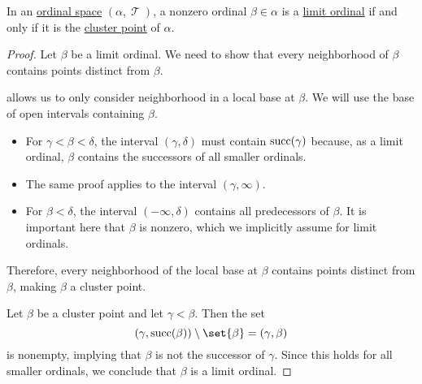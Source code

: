 \begin{proposition}\label{thm:limit_ordinal_order_topology}
  In an \hyperref[def:ordinal_space]{ordinal space} \( (\alpha, \mscrT) \), a nonzero ordinal \( \beta \in \alpha \) is a \hyperref[def:successor_and_limit_ordinal]{limit ordinal} if and only if it is the \hyperref[def:cluster_point]{cluster point} of \( \alpha \).
\end{proposition}
\begin{proof}
  \SufficiencySubProof Let \( \beta \) be a limit ordinal. We need to show that every neighborhood of \( \beta \) contains points distinct from \( \beta \).

   allows us to only consider neighborhood in a local base at \( \beta \). We will use the base of open intervals containing \( \beta \).
  \begin{itemize}
    \item For \( \gamma < \beta < \delta \), the interval \( (\gamma, \delta) \) must contain \( \operatorname{succ}(\gamma) \) because, as a limit ordinal, \( \beta \) contains the successors of all smaller ordinals.

    \item The same proof applies to the interval \( (\gamma, \infty) \).

    \item For \( \beta < \delta \), the interval \( (-\infty, \delta) \) contains all predecessors of \( \beta \). It is important here that \( \beta \) is nonzero, which we implicitly assume for limit ordinals.
  \end{itemize}

  Therefore, every neighborhood of the local base at \( \beta \) contains points distinct from \( \beta \), making \( \beta \) a cluster point.

  \NecessitySubProof Let \( \beta \) be a cluster point and let \( \gamma < \beta \). Then the set
  \begin{equation*}
    (\gamma, \op{succ}(\beta)) \setminus \set{ \beta }
    =
    (\gamma, \beta)
  \end{equation*}
  is nonempty, implying that \( \beta \) is not the successor of \( \gamma \). Since this holds for all smaller ordinals, we conclude that \( \beta \) is a limit ordinal.
\end{proof}
